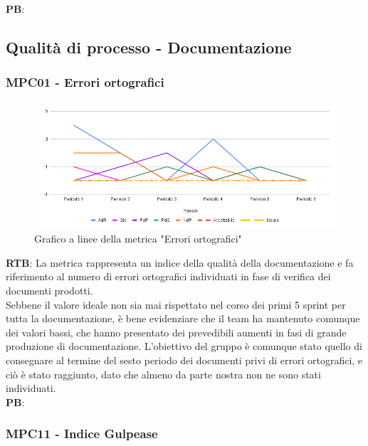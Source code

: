 \documentclass[10pt]{article}
\begin{document}
\begin{justify}
\noindent
\textbf{PB}:


\subsection{Qualità di processo - Documentazione}
\subsubsection{MPC01 - Errori ortografici}%

\begin{figure}[H]
  \centering
  \includegraphics[width=0.9\linewidth]{EO.png}
  \caption{Grafico a linee della metrica "Errori ortografici"}
  \label{fig:EOchart}
\end{figure}

\textbf{RTB}: La metrica rappresenta un indice della qualità della documentazione e fa riferimento al numero di errori ortografici individuati in fase di verifica 
dei documenti prodotti.\\
Sebbene il valore ideale non sia mai rispettato nel corso dei primi 5 sprint per tutta la documentazione, è bene evidenziare che il team ha mantenuto comunque dei valori bassi, che hanno 
presentato dei prevedibili aumenti in fasi di grande produzione di documentazione. L'obiettivo del gruppo è comunque stato quello di consegnare al termine del sesto periodo
dei documenti privi di errori ortografici, e ciò è stato raggiunto, dato che almeno da parte nostra non ne sono stati individuati.\\

\noindent
\textbf{PB}:


\subsubsection{MPC11 - Indice Gulpease}%


\end{justify}
\end{document}
